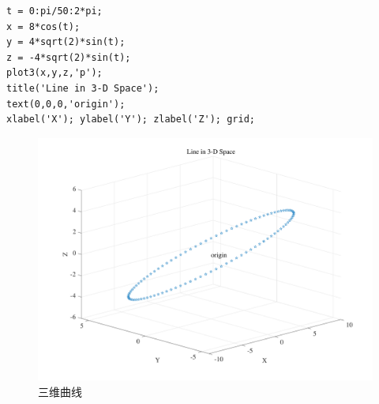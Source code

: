 \begin{lstlisting}
t = 0:pi/50:2*pi;
x = 8*cos(t);
y = 4*sqrt(2)*sin(t);
z = -4*sqrt(2)*sin(t);
plot3(x,y,z,'p');
title('Line in 3-D Space');
text(0,0,0,'origin');
xlabel('X'); ylabel('Y'); zlabel('Z'); grid;
\end{lstlisting}
\vspace*{-1.5em}
\begin{figure}[!htb]
	\centering
	\includegraphics[width=0.8\linewidth]{pic/三维图1.pdf}
	\vspace*{-3em}
	\caption{三维曲线}
\end{figure}

